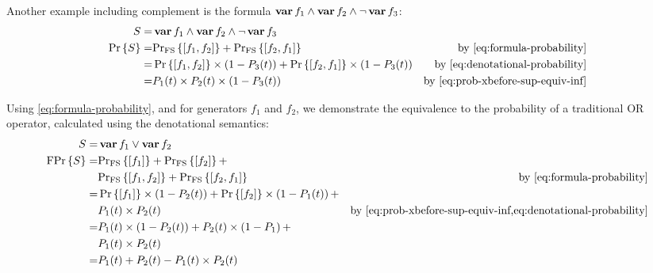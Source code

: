 Another example including complement is the formula $\operatorname{\mathbf{var}} f_1 \land \operatorname{\mathbf{var}} f_2 \land \lnot \operatorname{\mathbf{var}} f_3$:
%
\begin{align}
S = & \var{f_1} \land \var{f_2} \land \lnot \var{f_3}\nonumber\\
\probability{S} = &
\denotationalprob{\left[f_1,f_2\right]} + \denotationalprob{\left[f_2,f_1\right]} 
  & \text{by \cref{eq:formula-probability}}\nonumber\\
= & \probability{\left[f_1,f_2\right]}\times \left(1 - P_3(t)\right)
+ \probability{\left[f_2,f_1\right]}\times \left(1 - P_3(t)\right)
	& \text{by \cref{eq:denotational-probability}}\nonumber\\
= & P_1(t) \times P_2(t) \times \left(1 - P_3(t)\right) & \text{by \cref{eq:prob-xbefore-sup-equiv-inf}}
\end{align}

Using \cref{eq:formula-probability}, and for generators $f_1$ and $f_2$, we demonstrate the equivalence to the probability of a traditional \ac{OR} operator, calculated using the denotational semantics:
%
\begin{align}
S = & \vari{1} \lor \vari{2}\nonumber\\
\formulaprob{S} = & \denotationalprob{\left[f_1\right]} +
  \denotationalprob{\left[f_2\right]} + \nonumber\\
  & \denotationalprob{\left[f_1,f_2\right]} +
  \denotationalprob{\left[f_2,f_1\right]}
  & \text{by \cref{eq:formula-probability}}
\nonumber\\
= &\probability{\left[f_1\right]}\times\left(1 - P_2(t)\right) + 
\probability{\left[f_2\right]}\times\left(1 - P_1(t)\right) +\nonumber\\
&P_1(t) \times P_2(t) & \text{by \cref{eq:prob-xbefore-sup-equiv-inf,eq:denotational-probability}}\nonumber\\
= & P_1(t) \times \left(1 - P_2(t)\right) + P_2(t) \times \left(1 - P_1\right) + \nonumber\\
  & P_1(t) \times P_2(t)\nonumber\\
= & P_1(t) + P_2(t) - P_1(t) \times P_2(t)
\end{align}

